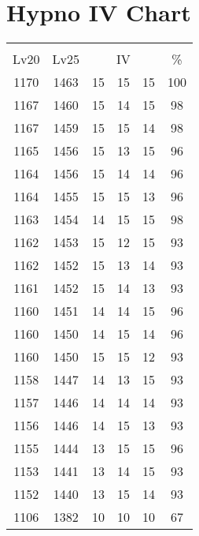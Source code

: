 \documentclass{article}%
\begin{document}
%
\normalsize%
\section{Hypno IV Chart}%
\label{sec:Hypno IV Chart}%
\renewcommand{\arraystretch}{1.5}%
\begin{tabular}{|c|c|c|c|c|c|}%
\hline%
\multicolumn{6}{|c|}{\textcolor{white}{ 
\linebreak{Hypno}
}%
\cellcolor{black}}\\%
\multicolumn{1}{|c}{Lv20}&\multicolumn{1}{c|}{Lv25}&\multicolumn{3}{c|}{IV}&\multicolumn{1}{|c|}{\%}\\%
\hline%
\rowcolor{color100}%
1170&1463&15&15&15&100\\%
\hline%
\rowcolor{color98}%
1167&1460&15&14&15&98\\%
\hline%
\rowcolor{color98}%
1167&1459&15&15&14&98\\%
\hline%
\rowcolor{color96}%
1165&1456&15&13&15&96\\%
\hline%
\rowcolor{color96}%
1164&1456&15&14&14&96\\%
\hline%
\rowcolor{color96}%
1164&1455&15&15&13&96\\%
\hline%
\rowcolor{color98}%
1163&1454&14&15&15&98\\%
\hline%
\rowcolor{color93}%
1162&1453&15&12&15&93\\%
\hline%
\rowcolor{color93}%
1162&1452&15&13&14&93\\%
\hline%
\rowcolor{color93}%
1161&1452&15&14&13&93\\%
\hline%
\rowcolor{color96}%
1160&1451&14&14&15&96\\%
\hline%
\rowcolor{color96}%
1160&1450&14&15&14&96\\%
\hline%
\rowcolor{color93}%
1160&1450&15&15&12&93\\%
\hline%
\rowcolor{color93}%
1158&1447&14&13&15&93\\%
\hline%
\rowcolor{color93}%
1157&1446&14&14&14&93\\%
\hline%
\rowcolor{color93}%
1156&1446&14&15&13&93\\%
\hline%
\rowcolor{color96}%
1155&1444&13&15&15&96\\%
\hline%
\rowcolor{color93}%
1153&1441&13&14&15&93\\%
\hline%
\rowcolor{color93}%
1152&1440&13&15&14&93\\%
\hline%
\rowcolor{color91}%
1106&1382&10&10&10&67\\%
\end{tabular}

%
\end{document}
